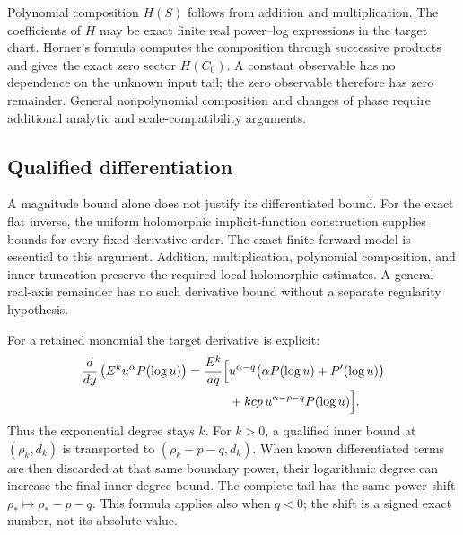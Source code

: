 Polynomial composition $H(S)$ follows from addition and multiplication.
The coefficients of $H$ may be exact finite real power--log expressions
in the target chart. Horner's formula computes the composition through
successive products and gives the exact zero sector $H(C_0)$. A constant
observable has no dependence on the unknown input tail; the zero observable
therefore has zero remainder. General nonpolynomial composition and changes
of phase require additional analytic and scale-compatibility arguments.

\subsection{Qualified differentiation}

A magnitude bound alone does not justify its differentiated bound.
For the exact flat inverse, the uniform holomorphic implicit-function
construction supplies bounds for every fixed derivative order. The exact
finite forward model is essential to this argument. Addition,
multiplication, polynomial composition, and inner truncation preserve the
required local holomorphic estimates. A general real-axis remainder has
no such derivative bound without a separate regularity hypothesis.

For a retained monomial the target derivative is explicit:
\begin{equation}
\begin{aligned}
 \frac{d}{dy}\left(E^k u^\alpha P(\log u)\right)
 =\frac{E^k}{a q}\Bigl[&u^{\alpha-q}
       \bigl(\alpha P(\log u)+P'(\log u)\bigr)\\
       &+kcp\,u^{\alpha-p-q}P(\log u)\Bigr].
\end{aligned}
 \label{eq:flat-target-derivative}
\end{equation}
Thus the exponential degree stays $k$. For $k>0$, a qualified inner
bound at $(\rho_k,d_k)$ is transported to
$(\rho_k-p-q,d_k)$. When known differentiated terms are then discarded at
that same boundary power, their logarithmic degree can increase the final
inner degree bound. The complete tail has the same power shift
$\rho_*\mapsto\rho_*-p-q$. This formula applies also when $q<0$;
the shift is a signed exact number, not its absolute value.

